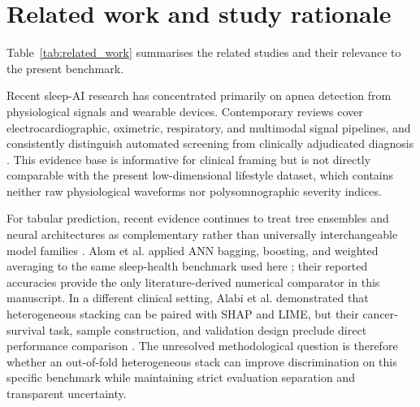\documentclass[a4paper,fleqn]{cas-dc}
\begin{document}
\section{Related work and study rationale}

Table~\ref{tab:related_work} summarises the related studies and their relevance to the present benchmark.

Recent sleep-AI research has concentrated primarily on apnea detection from physiological signals and wearable devices. Contemporary reviews cover electrocardiographic, oximetric, respiratory, and multimodal signal pipelines, and consistently distinguish automated screening from clinically adjudicated diagnosis \cite{bazoukis2023,tyagi2023,abdalrazaq2024,giorgi2025}. This evidence base is informative for clinical framing but is not directly comparable with the present low-dimensional lifestyle dataset, which contains neither raw physiological waveforms nor polysomnographic severity indices.

For tabular prediction, recent evidence continues to treat tree ensembles and neural architectures as complementary rather than universally interchangeable model families \cite{borisov2024}. Alom et al. applied ANN bagging, boosting, and weighted averaging to the same sleep-health benchmark used here \cite{alom2024}; their reported accuracies provide the only literature-derived numerical comparator in this manuscript. In a different clinical setting, Alabi et al. demonstrated that heterogeneous stacking can be paired with SHAP and LIME, but their cancer-survival task, sample construction, and validation design preclude direct performance comparison \cite{alabi2023}. The unresolved methodological question is therefore whether an out-of-fold heterogeneous stack can improve discrimination on this specific benchmark while maintaining strict evaluation separation and transparent uncertainty.
\end{document}
